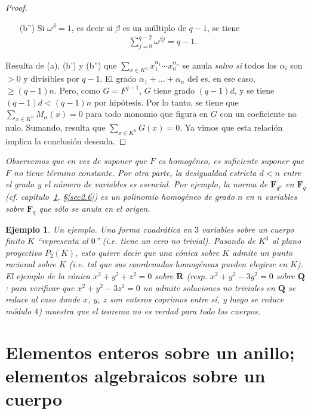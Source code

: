 \documentclass[10pt,oneside,bibtotoc,smallheadings,leqno,a5paper,DIV=12]{scrbook}
\newcommand{\RR}{\mathbf{R}}
\newcommand{\QQ}{\mathbf{Q}}
\newcommand{\FF}{\mathbf{F}}
\numberwithin{equation}{section}
\newenvironment{comm}%
	{\begin{trivlist}\item\small\itshape}
	{\end{trivlist}}
\theoremstyle{defi}
\theoremstyle{enonce}
\theoremstyle{rem}
\newtheorem*{example*}{Ejemplo}
\numberwithin{theorem}{section}
\numberwithin{proposition}{section}
\numberwithin{definition}{section}
\numberwithin{lemma}{section}
\numberwithin{corollary}{section}
\numberwithin{example}{section}
\numberwithin{footnote}{section}%
\begin{document}
\begin{proof}
\begin{enumerate}
\item[(b'')] Si $\omega^{\beta} = 1$, es decir si $\beta$ es un m\'ultiplo de $q-1$, se tiene
\begin{gather*}
\sum_{j=0}^{q-2}\omega^{\beta j} = q-1.
\end{gather*}
\end{enumerate}
Resulta de (a), (b') y (b'') que $\sum_{x\in K^{n}}x_{1}^{\alpha_{1}}\cdots x_{n}^{\alpha_{n}}$ se anula {\em salvo
si} todos los $\alpha_{i}$ son $>0$ y divisibles por $q-1$. El grado $\alpha_{1}+\dots+\alpha_{n}$ del
es, en ese caso, $\geq (q-1)n$. Pero, como $G = F^{q-1}$, $G$ tiene grado $(q-1)d$, y se tiene
$(q-1)d < (q-1)n$ por hip\'otesis. Por lo tanto, se tiene que $\sum_{x\in K^{n}}M_{\alpha}(x) = 0$ para todo
monomio que figura en $G$ con un coeficiente no nulo. Sumando, resulta que $\sum_{x\in K^{n}}G(x) = 0$. Ya vimos
que esta relaci\'on implica la conclusi\'on deseada.
\end{proof}

\begin{comm}
Observemos que en vez de suponer que $F$ es homog\'eneo, es suficiente suponer que $F$ no tiene t\'ermino constante.
Por otra parte, la desigualdad {\em estricta} $d < n$ entre el grado y el n\'umero de variables es esencial.
Por ejemplo, la {\em norma} de $\FF_{q^{n}}$ en $\FF_{q}$ (cf. cap\'itulo~\ref{cap2}, \S\ref{sec2.6}) es un polinomio
homog\'eneo de grado $n$ en $n$ variables sobre $\FF_{q}$ que s\'olo se anula en el origen.
\end{comm}

\begin{example*}
{\itshape Un ejemplo.} Una forma cuadr\'atica en $3$ variables sobre un cuerpo {\em finito} $K$
``representa al $0$'' (i.e. tiene un cero no trivial). Pasando de $K^{3}$ al plano proyectivo
$P_{2}(K)$, esto quiere decir que una {\em c\'onica} sobre $K$ admite un punto racional sobre $K$
(i.e. tal que sus coordenadas homog\'eneas pueden elegirse en $K$). El ejemplo de la c\'onica
$x^{2}+y^{2}+z^{2}=0$ sobre $\RR$ (resp. $x^{2}+y^{2}-3y^{2}=0$ sobre $\QQ$: para verificar que
$x^{2}+y^{2}-3z^{2}=0$ no admite soluciones no triviales en $\QQ$ se reduce al caso donde $x$, $y$, $z$
son enteros coprimos entre s\'i, y luego se reduce m\'odulo $4$) muestra que el teorema no es verdad para
todo los cuerpos.
\end{example*}

\chapter%
{Elementos enteros sobre un anillo; elementos algebraicos sobre un cuerpo}
\label{cap2}
\end{document}
